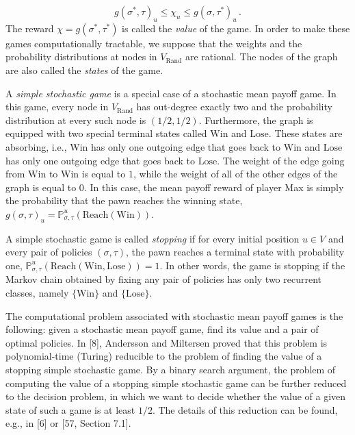 \[
g(\sigma^{*},\tau)_{u}\leq\chi_{u}\leq g(\sigma,\tau^{*})_{u}\,.
\]
The reward $\chi=g(\sigma^{*},\tau^{*})$ is called the \emph{value} of the game. In order to make these games computationally tractable, we suppose that the weights and the probability distributions at nodes in $V_{\mathrm{Rand}}$ are rational. The nodes of the graph are also called the \emph{states} of the game.

A \emph{simple stochastic game} is a special case of a stochastic mean payoff game. In this game, every node in $V_{\mathrm{Rand}}$ has out-degree exactly two and the probability distribution at every such node is $(1/2,1/2)$. Furthermore, the graph is equipped with two special terminal states called $\mathrm{Win}$ and $\mathrm{Lose}$. These states are absorbing, i.e., $\mathrm{Win}$ has only one outgoing edge that goes back to $\mathrm{Win}$ and $\mathrm{Lose}$ has only one outgoing edge that goes back to $\mathrm{Lose}$. The weight of the edge going from $\mathrm{Win}$ to $\mathrm{Win}$ is equal to $1$, while the weight of all of the other edges of the graph is equal to $0$. In this case, the mean payoff reward of player Max is simply the probability that the pawn reaches the winning state, $g(\sigma,\tau)_{u}=\mathbb{P}^{u}_{\sigma,\tau}(\text{Reach}(\mathrm{Win}))$.

A simple stochastic game is called \emph{stopping} if for every initial position $u\in V$ and every pair of policies $(\sigma,\tau)$, the pawn reaches a terminal state with probability one, $\mathbb{P}^{u}_{\sigma,\tau}(\text{Reach}(\mathrm{Win},\mathrm{Lose}))=1$. In other words, the game is stopping if the Markov chain obtained by fixing any pair of policies has only two recurrent classes, namely $\{\mathrm{Win}\}$ and $\{\mathrm{Lose}\}$.

The computational problem associated with stochastic mean payoff games is the following: given a stochastic mean payoff game, find its value and a pair of optimal policies. In [8], Andersson and Miltersen proved that this problem is polynomial-time (Turing) reducible to the problem of finding the value of a stopping simple stochastic game. By a binary search argument, the problem of computing the value of a stopping simple stochastic game can be further reduced to the decision problem, in which we want to decide whether the value of a given state of such a game is at least $1/2$. The details of this reduction can be found, e.g., in [6] or [57, Section 7.1].

